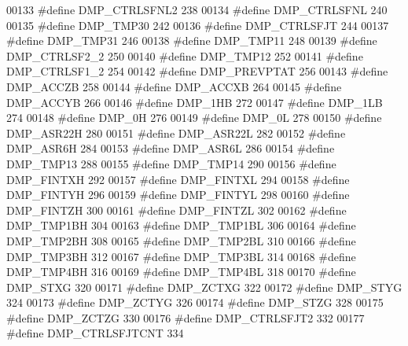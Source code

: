 \begin{DoxyCode}
00133 \textcolor{preprocessor}{#define DMP\_CTRLSFNL2    238}
00134 \textcolor{preprocessor}{#define DMP\_CTRLSFNL    240}
00135 \textcolor{preprocessor}{#define DMP\_TMP30    242}
00136 \textcolor{preprocessor}{#define DMP\_CTRLSFJT    244}
00137 \textcolor{preprocessor}{#define DMP\_TMP31    246}
00138 \textcolor{preprocessor}{#define DMP\_TMP11    248}
00139 \textcolor{preprocessor}{#define DMP\_CTRLSF2\_2    250}
00140 \textcolor{preprocessor}{#define DMP\_TMP12    252}
00141 \textcolor{preprocessor}{#define DMP\_CTRLSF1\_2    254}
00142 \textcolor{preprocessor}{#define DMP\_PREVPTAT    256}
00143 \textcolor{preprocessor}{#define DMP\_ACCZB    258}
00144 \textcolor{preprocessor}{#define DMP\_ACCXB    264}
00145 \textcolor{preprocessor}{#define DMP\_ACCYB    266}
00146 \textcolor{preprocessor}{#define DMP\_1HB    272}
00147 \textcolor{preprocessor}{#define DMP\_1LB    274}
00148 \textcolor{preprocessor}{#define DMP\_0H    276}
00149 \textcolor{preprocessor}{#define DMP\_0L    278}
00150 \textcolor{preprocessor}{#define DMP\_ASR22H    280}
00151 \textcolor{preprocessor}{#define DMP\_ASR22L    282}
00152 \textcolor{preprocessor}{#define DMP\_ASR6H    284}
00153 \textcolor{preprocessor}{#define DMP\_ASR6L    286}
00154 \textcolor{preprocessor}{#define DMP\_TMP13    288}
00155 \textcolor{preprocessor}{#define DMP\_TMP14    290}
00156 \textcolor{preprocessor}{#define DMP\_FINTXH    292}
00157 \textcolor{preprocessor}{#define DMP\_FINTXL    294}
00158 \textcolor{preprocessor}{#define DMP\_FINTYH    296}
00159 \textcolor{preprocessor}{#define DMP\_FINTYL    298}
00160 \textcolor{preprocessor}{#define DMP\_FINTZH    300}
00161 \textcolor{preprocessor}{#define DMP\_FINTZL    302}
00162 \textcolor{preprocessor}{#define DMP\_TMP1BH    304}
00163 \textcolor{preprocessor}{#define DMP\_TMP1BL    306}
00164 \textcolor{preprocessor}{#define DMP\_TMP2BH    308}
00165 \textcolor{preprocessor}{#define DMP\_TMP2BL    310}
00166 \textcolor{preprocessor}{#define DMP\_TMP3BH    312}
00167 \textcolor{preprocessor}{#define DMP\_TMP3BL    314}
00168 \textcolor{preprocessor}{#define DMP\_TMP4BH    316}
00169 \textcolor{preprocessor}{#define DMP\_TMP4BL    318}
00170 \textcolor{preprocessor}{#define DMP\_STXG    320}
00171 \textcolor{preprocessor}{#define DMP\_ZCTXG    322}
00172 \textcolor{preprocessor}{#define DMP\_STYG    324}
00173 \textcolor{preprocessor}{#define DMP\_ZCTYG    326}
00174 \textcolor{preprocessor}{#define DMP\_STZG    328}
00175 \textcolor{preprocessor}{#define DMP\_ZCTZG    330}
00176 \textcolor{preprocessor}{#define DMP\_CTRLSFJT2    332}
00177 \textcolor{preprocessor}{#define DMP\_CTRLSFJTCNT    334}

\end{DoxyCode}
